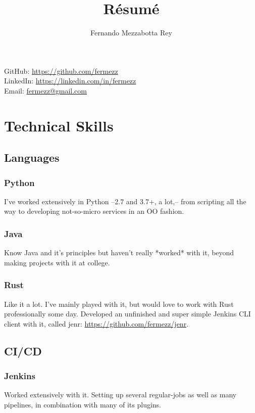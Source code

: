 \documentclass{article}
\makeatletter
\renewcommand{\maketitle}
{\begin{center}
{\huge\bfseries
\theauthor}

\vspace{.5em}

GitHub: \url{https://github.com/fermezz}\\LinkedIn: \url{https://linkedin.com/in/fermezz}\\Email: \url{fermezz@gmail.com}

\end{center}}
\makeatother
\begin{document}
\title{R\'esum\'e}
\author{Fernando Mezzabotta Rey}

\maketitle

\section{Technical Skills}
\subsection{Languages}
\subsubsection{Python}
  \begin{description}
    \item I've worked extensively in Python –2.7 and 3.7+, a lot,– from scripting all the way to developing not-so-micro services in an OO fashion.
  \end{description}
\subsubsection{Java}
  \begin{description}
    \item Know Java and it's principles but haven't really *worked* with it, beyond making projects with it at college.
  \end{description}
\subsubsection{Rust}
  \begin{description}
    \item Like it a lot. I've mainly played with it, but would love to work with Rust professionally some day. Developed an unfinished and super simple Jenkins CLI client with it, called jenr: \url{https://github.com/fermezz/jenr}.
  \end{description}
\subsection{CI/CD}
\subsubsection{Jenkins}
  \begin{description}
    \item Worked extensively with it. Setting up several regular-jobs as well as many pipelines, in combination with many of its plugins.
  \end{description}
\end{document}
